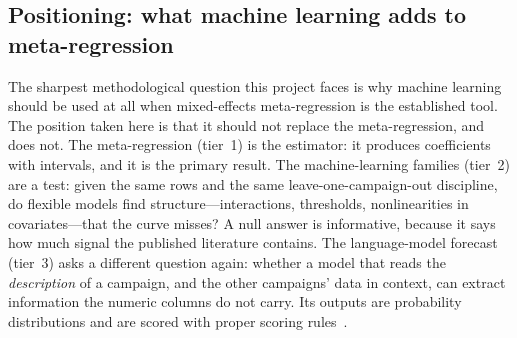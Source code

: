 \subsection{Positioning: what machine learning adds to meta-regression}

The sharpest methodological question this project faces is why machine learning should be used at all when
mixed-effects meta-regression is the established tool. The position taken here is that it should not replace the
meta-regression, and does not. The meta-regression (tier~1) is the estimator: it produces coefficients with
intervals, and it is the primary result. The machine-learning families (tier~2) are a test: given the same rows
and the same leave-one-campaign-out discipline, do flexible models find structure---interactions, thresholds,
nonlinearities in covariates---that the curve misses? A null answer is informative, because it says how much
signal the published literature contains. The language-model forecast (tier~3) asks a different question again:
whether a model that reads the \emph{description} of a campaign, and the other campaigns' data in context, can
extract information the numeric columns do not carry. Its outputs are probability distributions and are scored with
proper scoring rules~\citep{gneiting2007,epstein1969}.
